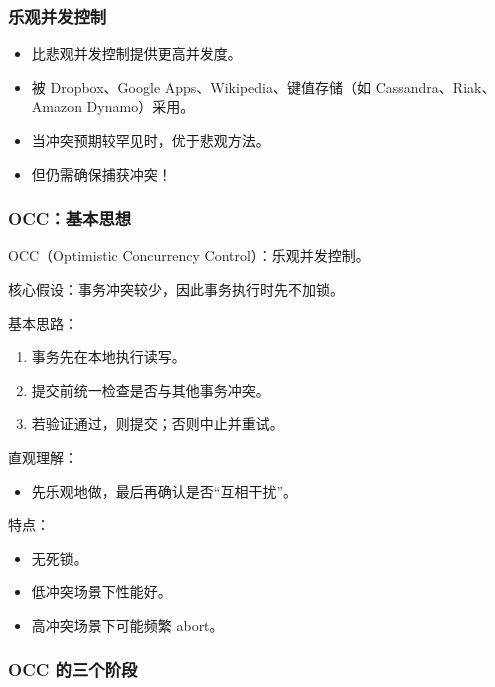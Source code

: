 \documentclass[UTF8,a4paper,11pt]{ctexart}
\begin{document}
\subsubsection{乐观并发控制}

\begin{itemize}
  \item 比悲观并发控制提供更高并发度。
  \item 被 Dropbox、Google Apps、Wikipedia、键值存储（如 Cassandra、Riak、Amazon Dynamo）采用。
  \item 当冲突预期较罕见时，优于悲观方法。
  \item 但仍需确保捕获冲突！
\end{itemize}

\subsubsection{OCC：基本思想}

OCC（Optimistic Concurrency Control）：乐观并发控制。

核心假设：事务冲突较少，因此事务执行时先不加锁。

基本思路：

\begin{enumerate}
  \item 事务先在本地执行读写。
  \item 提交前统一检查是否与其他事务冲突。
  \item 若验证通过，则提交；否则中止并重试。
\end{enumerate}

直观理解：

\begin{itemize}
  \item 先乐观地做，最后再确认是否“互相干扰”。
\end{itemize}

特点：

\begin{itemize}
  \item 无死锁。
  \item 低冲突场景下性能好。
  \item 高冲突场景下可能频繁 abort。
\end{itemize}

\subsubsection{OCC 的三个阶段}
\end{document}
